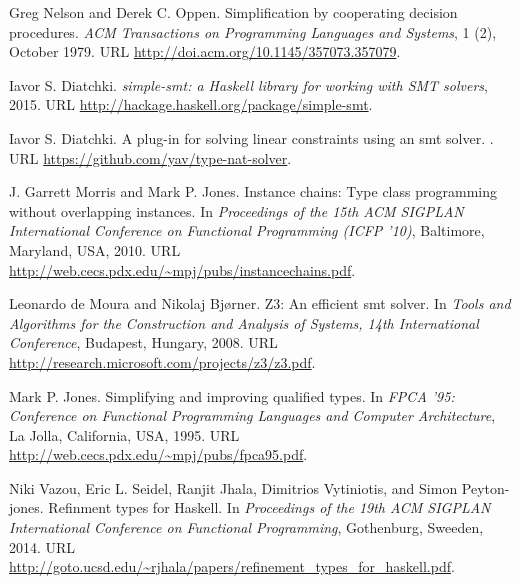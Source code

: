 \documentclass{sigplanconf}
\begin{document}
\begin{thebibliography}{}
{Greg Nelson} and {Derek C. Oppen}.
\newblock Simplification by cooperating decision procedures.
\newblock \emph{ACM Transactions on Programming Languages and Systems},
  1 (2), October 1979.
\newblock URL \url{http://doi.acm.org/10.1145/357073.357079}.

{Iavor S. Diatchki}.
\newblock \emph{simple-smt: a {Haskell} library for working with SMT solvers},
  2015{}.
\newblock URL \url{http://hackage.haskell.org/package/simple-smt}.

{Iavor S. Diatchki}.
\newblock A plug-in for solving linear constraints using an smt solver.
.
\newblock URL \url{https://github.com/yav/type-nat-solver}.

{J. Garrett Morris} and {Mark P. Jones}.
\newblock Instance chains: Type class programming without overlapping
  instances.
\newblock In \emph{Proceedings of the 15th ACM SIGPLAN International Conference
  on Functional Programming (ICFP '10)}, Baltimore, Maryland, USA, 2010.
\newblock URL \url{http://web.cecs.pdx.edu/~mpj/pubs/instancechains.pdf}.

{Leonardo de Moura} and {Nikolaj Bjørner}.
\newblock Z3: An efficient smt solver.
\newblock In \emph{Tools and Algorithms for the Construction and Analysis of
  Systems, 14th International Conference}, Budapest, Hungary, 2008.
\newblock URL \url{http://research.microsoft.com/projects/z3/z3.pdf}.

{Mark P. Jones}.
\newblock Simplifying and improving qualified types.
\newblock In \emph{FPCA '95: Conference on Functional Programming Languages and
  Computer Architecture}, La Jolla, California, USA, 1995.
\newblock URL \url{http://web.cecs.pdx.edu/~mpj/pubs/fpca95.pdf}.

{Niki Vazou}, {Eric L. Seidel}, {Ranjit Jhala}, {Dimitrios Vytiniotis}, and
  {Simon Peyton-jones}.
\newblock Refinment types for Haskell.
\newblock In \emph{Proceedings of the 19th ACM SIGPLAN International Conference
  on Functional Programming}, Gothenburg, Sweeden, 2014.
\newblock URL
  \url{http://goto.ucsd.edu/~rjhala/papers/refinement_types_for_haskell.pdf}.


\end{thebibliography}
\end{document}
